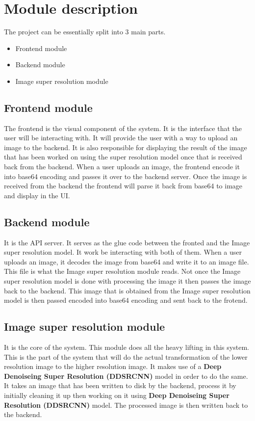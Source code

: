 \chapter{Module description}

The project can be essentially split into 3 main parts.

\begin{itemize}
\item Frontend module
\item Backend module
\item Image super resolution module
\end{itemize}

\section{Frontend module}

The frontend is the visual component of the system. It is the interface that the user will be interacting with. It will provide the user with a way to upload an image to the backend. It is also responsible for displaying the result of the image that has been worked on using the super resolution model once that is received back from the backend.
When a user uploads an image, the frontend encode it into base64 encoding and passes it over to the backend server. Once the image is received from the backend the frontend will parse it back from base64 to image and display in the UI.

\section{Backend module}

It is the API server. It serves as the glue code between the fronted and the Image super resolution model. It work be interacting with both of them. When a user uploads an image, it decodes the image from base64 and write it to an image file. This file is what the Image super resolution module reads. Not once the Image super resolution model is done with processing the image it then passes the image back to the backend. This image that is obtained from the Image super resolution model is then passed encoded into base64 encoding and sent back to the frotend.


\section{Image super resolution module}
It is the core of the system. This module does all the heavy lifting in this system. This is the part of the system that will do the actual transformation of the lower resolution image to the higher resolution image. It makes use of a \textbf{Deep Denoiseing Super Resolution (DDSRCNN)} model in order to do the same. It takes an image that has been written to disk by the backend, process it by initially cleaning it up then working on it using \textbf{Deep Denoiseing Super Resolution (DDSRCNN)} model. The processed image is then written back to the backend.
